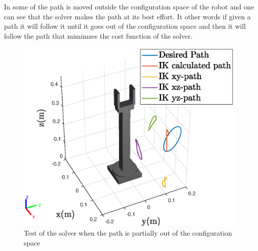 In  some of the path is moved outside the configuration space of the robot and one can see that the solver makes the path at its best effort. It other words if given a path it will follow it until it goes out of the configuration space and then it will follow the path that mimimzes the cost function of the solver. 



\begin{figure}[htbp]
  \centering
  \includegraphics[width=.9\textwidth]{img/outOS.eps}
  \caption{Test of the solver when the path is partially out of the configuration space}
  \label{fig:outOC}
\end{figure}








































